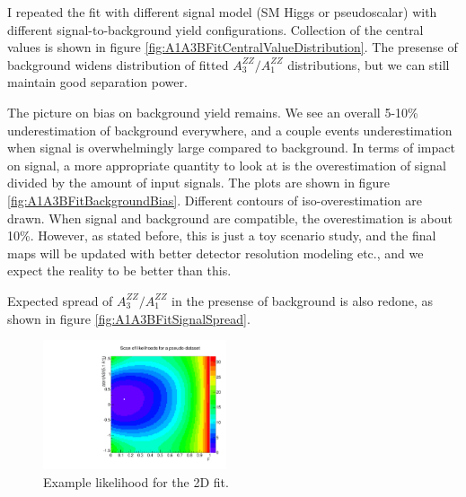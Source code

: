 \documentclass{cmspaper}
\begin{document}
I repeated the fit with different signal model (SM Higgs or pseudoscalar) with different signal-to-background
yield configurations.  Collection of the central values is shown in figure \ref{fig:A1A3BFitCentralValueDistribution}.
The presense of background widens distribution of fitted $A_3^{ZZ} / A_1^{ZZ}$ distributions, but
we can still maintain good separation power.

The picture on bias on background yield remains.  We see an overall 5-10\% underestimation of background
everywhere, and a couple events underestimation when signal is overwhelmingly large compared to background.
In terms of impact on signal, a more appropriate quantity to look at is the overestimation of signal
divided by the amount of input signals.  The plots are shown in figure \ref{fig:A1A3BFitBackgroundBias}.
Different contours of iso-overestimation are drawn.  When signal and background are compatible, the
overestimation is about 10\%.  However, as stated before, this is just a toy scenario study, and
the final maps will be updated with better detector resolution modeling etc., and we expect the reality to
be better than this.

Expected spread of $A_3^{ZZ} / A_1^{ZZ}$ in the presense of background is also redone, as shown in figure
\ref{fig:A1A3BFitSignalSpread}.

\begin{figure}[htb!]
  \begin{center}
    \includegraphics[width=0.48\textwidth]{figures/A1A3BFit_ScanLikelihood_40_10_10.pdf}
    \caption{Example likelihood for the 2D fit.}
    \label{fig:A1A3BFitLikelihoodExample}
  \end{center}
\end{figure}
\end{document}
